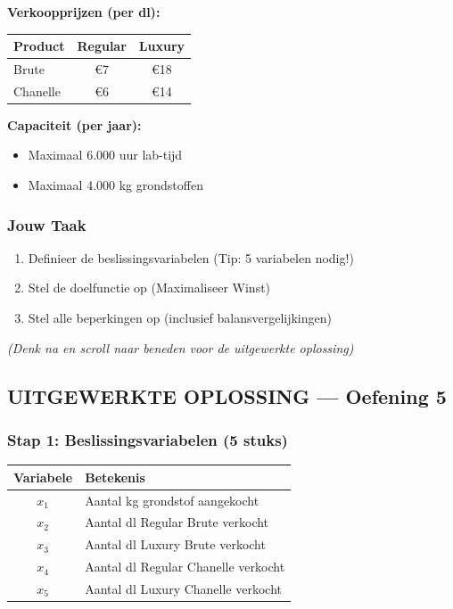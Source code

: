 \documentclass[a4paper,11pt]{article}
\begin{document}
\begin{oefenblok}[title=Lineair Programmeren — Rylon Parfums]
\textbf{Verkoopprijzen (per dl):}
\begin{center}
\begin{tabular}{|l|c|c|}
\hline
\textbf{Product} & \textbf{Regular} & \textbf{Luxury} \\
\hline
Brute & €7 & €18 \\
\hline
Chanelle & €6 & €14 \\
\hline
\end{tabular}
\end{center}

\textbf{Capaciteit (per jaar):}
\begin{itemize}
    \item Maximaal 6.000 uur lab-tijd
    \item Maximaal 4.000 kg grondstoffen
\end{itemize}

\subsubsection*{Jouw Taak}
\begin{enumerate}
    \item Definieer de beslissingsvariabelen (Tip: 5 variabelen nodig!)
    \item Stel de doelfunctie op (Maximaliseer Winst)
    \item Stel alle beperkingen op (inclusief balansvergelijkingen)
\end{enumerate}

\vspace{0.3cm}
\textit{(Denk na en scroll naar beneden voor de uitgewerkte oplossing)}


\subsection*{UITGEWERKTE OPLOSSING — Oefening 5}

\subsubsection*{Stap 1: Beslissingsvariabelen (5 stuks)}

\begin{center}
\begin{tabular}{|c|l|}
\hline
\textbf{Variabele} & \textbf{Betekenis} \\
\hline
$x_1$ & Aantal kg grondstof aangekocht \\
\hline
$x_2$ & Aantal dl Regular Brute verkocht \\
\hline
$x_3$ & Aantal dl Luxury Brute verkocht \\
\hline
$x_4$ & Aantal dl Regular Chanelle verkocht \\
\hline
$x_5$ & Aantal dl Luxury Chanelle verkocht \\
\hline
\end{tabular}
\end{center}


\end{oefenblok}
\end{document}
